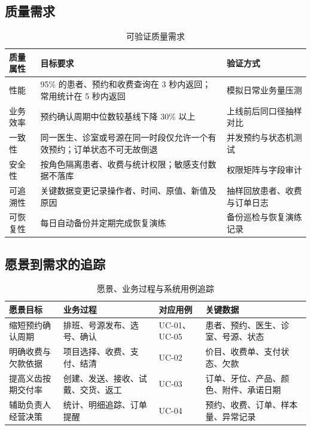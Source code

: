 \documentclass[UTF8,a4paper,12pt,fontset=fandol]{ctexart}
\begin{document}
\subsection{质量需求}
\begin{table}[H]
\centering
\caption{可验证质量需求}
\begin{tabularx}{\textwidth}{L{2.3cm}Y L{4.0cm}}
\toprule
质量属性 & 目标要求 & 验证方式 \\
\midrule
性能 & 95\% 的患者、预约和收费查询在 3 秒内返回；常用统计在 5 秒内返回 & 模拟日常业务量压测 \\
业务效率 & 预约确认周期中位数较基线下降 30\% 以上 & 上线前后同口径抽样对比 \\
一致性 & 同一医生、诊室或号源在同一时段仅允许一个有效预约；订单状态不可无故倒退 & 并发预约与状态机测试 \\
安全性 & 按角色隔离患者、收费与统计权限；敏感支付数据不落库 & 权限矩阵与字段审计 \\
可追溯性 & 关键数据变更记录操作者、时间、原值、新值及原因 & 抽样回放患者、收费与订单日志 \\
可恢复性 & 每日自动备份并定期完成恢复演练 & 备份巡检与恢复演练记录 \\
\bottomrule
\end{tabularx}
\end{table}

\subsection{愿景到需求的追踪}
\begin{table}[H]
\centering
\caption{愿景、业务过程与系统用例追踪}
\begin{tabularx}{\textwidth}{L{3.4cm}L{4.5cm}L{1.4cm}Y}
\toprule
愿景目标 & 业务过程 & 对应用例 & 关键数据 \\
\midrule
缩短预约确认周期 & 排班、号源发布、选号、确认 & UC-01、UC-05 & 患者、预约、医生、诊室、号源、状态 \\
明确收费与欠款依据 & 项目选择、收费、支付、结清 & UC-02 & 价目、收费单、支付状态、欠款 \\
提高义齿按期交付率 & 创建、发送、接收、试戴、交货、返工 & UC-03 & 订单、牙位、产品、颜色、附件、承诺日期 \\
辅助负责人经营决策 & 统计、明细追踪、订单提醒 & UC-04 & 预约、收费、订单、样本量、异常记录 \\
\bottomrule
\end{tabularx}
\end{table}
\end{document}
